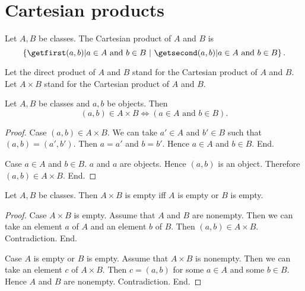 \documentclass[../set-theory.tex]{subfiles}
\begin{document}
  \section{Cartesian products}

  \begin{forthel}
    \begin{definition}\label{SET_THEORY_04_2877806274936832}
      Let $A, B$ be classes.
      The Cartesian product of $A$ and $B$ is
      \[ \class{ (a, b) | \text{$a \in A$ and $b \in B$} }. \]
    \end{definition}

    Let the direct product of $A$ and $B$ stand for  the Cartesian product of
    $A$ and $B$.
    Let $A \times B$ stand for the Cartesian product of $A$ and $B$.
  \end{forthel}

  \begin{forthel}
    \begin{proposition}\label{SET_THEORY_04_1581118511906816}
      Let $A, B$ be classes and $a, b$ be objects.
      Then \[ (a, b) \in A \times B \iff (\text{$a \in A$ and $b \in B$}). \]
    \end{proposition}
    \begin{proof}
      Case $(a, b) \in A \times B$.
        We can take $a' \in A$ and $b' \in B$ such that $(a, b) = (a', b')$.
        Then $a = a'$ and $b = b'$.
        Hence $a \in A$ and $b \in B$.
      End.

      Case $a \in A$ and $b \in B$.
        $a$ and $a$ are objects.
        Hence $(a, b)$ is an object.
        Therefore $(a, b) \in A \times B$.
      End.
    \end{proof}
  \end{forthel}

  \begin{forthel}
    \begin{proposition}\label{SET_THEORY_04_2198552029691904}
      Let $A, B$ be classes.
      Then $A \times B$ is empty iff $A$ is empty or $B$ is empty.
    \end{proposition}
    \begin{proof}
      Case $A \times B$ is empty.
        Assume that $A$ and $B$ are nonempty.
        Then we can take an element $a$ of $A$ and an element $b$ of $B$.
        Then $(a, b) \in A \times B$.
        Contradiction.
      End.

      Case $A$ is empty or $B$ is empty.
        Assume that $A \times B$ is nonempty.
        Then we can take an element $c$ of $A \times B$.
        Then $c = (a, b)$ for some $a \in A$ and some $b \in B$.
        Hence $A$ and $B$ are nonempty.
        Contradiction.
      End.
    \end{proof}
  \end{forthel}
\end{document}
